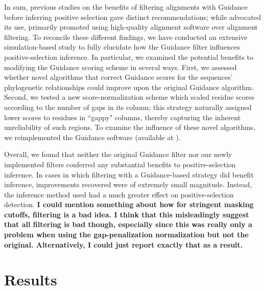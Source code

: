 \documentclass[10pt]{article}
\begin{document}
In sum, previous studies on the benefits of filtering alignments with Guidance before inferring positive selection gave distinct recommendations; while \citet{Privman2012} advocated its use, \citet{Jordan2012} primarily promoted using high-quality alignment software over alignment filtering. To reconcile these different findings, we have conducted an extensive simulation-based study to fully elucidate how the Guidance filter influences positive-selection inference. In particular, we examined the potential benefits to modifying the Guidance scoring scheme in several ways. First, we assessed whether novel algorithms that correct Guidance scores for the sequences' phylogenetic relationships could improve upon the original Guidance algorithm. Second, we tested a new score-normalization scheme which scaled residue scores according to the number of gaps in its column; this strategy naturally assigned lower scores to residues in ``gappy" columns, thereby capturing the inherent unreliability of  such regions. To examine the influence of these novel algorithms, we reimplemented the Guidance software (available at ).

Overall, we found that neither the original Guidance filter nor our newly implemented filters conferred any substantial benefits to positive-selection inference. In cases in which filtering with a Guidance-based strategy did benefit inference, improvements recovered were of extremely small magnitude. Instead, the inference method used had a much greater effect on positive-selection detection. \textbf{I could mention something about how for stringent masking cutoffs, filtering is a bad idea. I think that this misleadingly suggest that all filtering is bad though, especially since this was really only a problem when using the gap-penalization normalization but not the original. Alternatively, I could just report exactly that as a result.}


\section*{Results}
\end{document}
